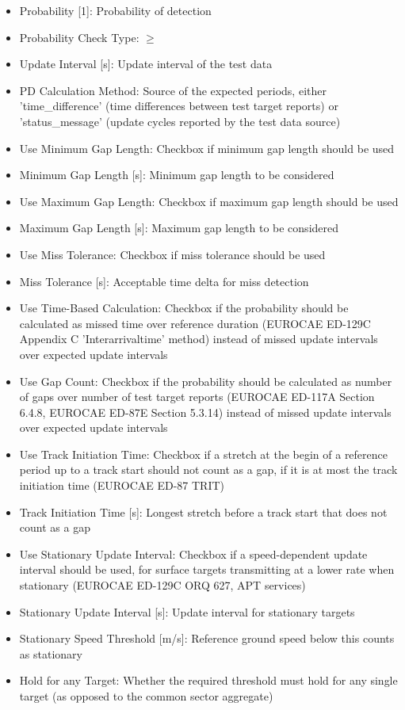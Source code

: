 \begin{itemize}  
\item Probability [1]: Probability of detection
\item Probability Check Type: $\geq$
\item Update Interval [s]: Update interval of the test data
\item PD Calculation Method: Source of the expected periods, either 'time\_difference' (time differences between test target reports) or 'status\_message' (update cycles reported by the test data source)
\item Use Minimum Gap Length: Checkbox if minimum gap length should be used
\item Minimum Gap Length [s]: Minimum gap length to be considered
\item Use Maximum Gap Length: Checkbox if maximum gap length should be used
\item Maximum Gap Length [s]: Maximum gap length to be considered
\item Use Miss Tolerance: Checkbox if miss tolerance should be used
\item Miss Tolerance [s]: Acceptable time delta for miss detection
\item Use Time-Based Calculation: Checkbox if the probability should be calculated as missed time over reference duration (EUROCAE ED-129C Appendix C 'Interarrivaltime' method) instead of missed update intervals over expected update intervals
\item Use Gap Count: Checkbox if the probability should be calculated as number of gaps over number of test target reports (EUROCAE ED-117A Section 6.4.8, EUROCAE ED-87E Section 5.3.14) instead of missed update intervals over expected update intervals
\item Use Track Initiation Time: Checkbox if a stretch at the begin of a reference period up to a track start should not count as a gap, if it is at most the track initiation time (EUROCAE ED-87 TRIT)
\item Track Initiation Time [s]: Longest stretch before a track start that does not count as a gap
\item Use Stationary Update Interval: Checkbox if a speed-dependent update interval should be used, for surface targets transmitting at a lower rate when stationary (EUROCAE ED-129C ORQ 627, APT services)
\item Stationary Update Interval [s]: Update interval for stationary targets
\item Stationary Speed Threshold [m/s]: Reference ground speed below this counts as stationary
\item Hold for any Target: Whether the required threshold must hold for any single target (as opposed to the common sector aggregate)
\end{itemize}
\ \\

